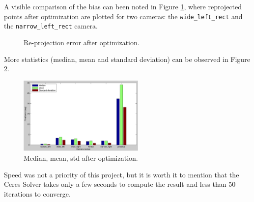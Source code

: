 A visible comparison of the bias can been noted in Figure \ref{fig:reprojection}, where reprojected points after optimization are plotted for two cameras: the \texttt{wide\_left\_rect} and the \texttt{narrow\_left\_rect} camera.
\begin{figure}[!htbp]
  \centering
  \caption{Re-projection error after optimization.}
  \label{fig:reprojection}
\end{figure}



More statistics (median, mean and standard deviation) can be observed in Figure \ref{fig:stats}.
\begin{figure}[!htbp]
 \centering
 \includegraphics[width=0.55\textwidth]{images/stats.pdf}
 \caption{Median, mean, std after optimization.}
 \label{fig:stats}
\end{figure}


Speed was not a priority of this project, but it is worth it to mention that the Ceres Solver takes only a few seconds to compute the result and less than 50 iterations to converge.


